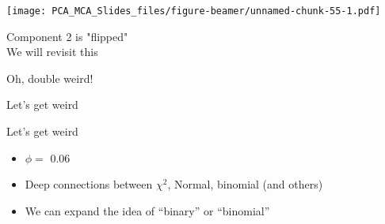 \documentclass[
  ignorenonframetext,
]{beamer}
\begin{document}
\begin{frame}

\texttt{[image: PCA\_MCA\_Slides\_files/figure-beamer/unnamed-chunk-55-1.pdf]}

\begin{center}Component 2 is "flipped" \\
We will revisit this
\end{center}

\end{frame}

\begin{frame}

\begin{table}[H]
\centering
{}
\end{table}
\begin{center}Oh, double weird!\end{center}

\end{frame}

\begin{frame}{Let's get weird}
\protect\hypertarget{lets-get-weird}{}

\begin{table}[H]
\centering
{}
\end{table}

\end{frame}

\begin{frame}{Let's get weird}
\protect\hypertarget{lets-get-weird-1}{}

\begin{table}[H]
\centering
{}
\end{table}

\begin{itemize}[<+->]
\item
  \(\phi=\) 0.06
\item
  Deep connections between \(\chi^2\), Normal, binomial (and others)
\item
  We can expand the idea of ``binary'' or ``binomial''
\end{itemize}

\end{frame}
\end{document}
